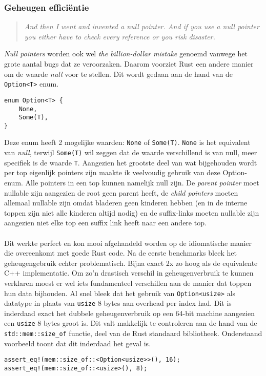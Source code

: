 \subsubsection{Geheugen efficiëntie}
\begin{quote}
    \textit{And then I went and invented a null pointer.
    And if you use a null pointer you either have to check every reference or you risk disaster. \cite{null_mistake}}
\end{quote}
\textit{Null pointers} worden ook wel \textit{the billion-dollar mistake} genoemd vanwege het grote aantal bugs dat ze veroorzaken.
Daarom voorziet Rust een andere manier om de waarde \textit{null} voor te stellen.
Dit wordt gedaan aan de hand van de \texttt{Option<T>} enum.

\begin{verbatim}
enum Option<T> {
    None,
    Some(T),
}
\end{verbatim}

Deze enum heeft 2 mogelijke waarden: \texttt{None} of \texttt{Some(T)}.
\texttt{None} is het equivalent van \textit{null}, terwijl \texttt{Some(T)} wil zeggen dat de waarde verschillend is van null, meer specifiek is de waarde \texttt{T}.
Aangezien het grootste deel van wat bijgehouden wordt per top eigenlijk pointers zijn maakte ik veelvoudig gebruik van deze Option-enum.
Alle pointers in een top kunnen namelijk null zijn.
De \textit{parent pointer} moet nullable zijn aangezien de root geen parent heeft, de \textit{child pointers} moeten allemaal nullable zijn omdat bladeren geen kinderen hebben (en in de interne toppen zijn niet alle kinderen altijd nodig) en de suffix-links moeten nullable zijn aangezien niet elke top een suffix link heeft naar een andere top.
\\ \\
Dit werkte perfect en kon mooi afgehandeld worden op de idiomatische manier die overeenkomt met goede Rust code.
Na de eerste benchmarks bleek het geheugengebruik echter problematisch.
Bijna exact 2x zo hoog als de equivalente C++ implementatie.
Om zo'n drastisch verschil in geheugenverbruik te kunnen verklaren moest er wel iets fundamenteel verschillen aan de manier dat toppen hun data bijhouden.
Al snel bleek dat het gebruik van \texttt{Option<usize>} als datatype in plaats van \texttt{usize} 8 bytes aan overhead per index had.
Dit is inderdaad exact het dubbele geheugenverbruik op een 64-bit machine aangezien een \texttt{usize} 8 bytes groot is.
Dit valt makkelijk te controleren aan de hand van de \texttt{std::mem::size\_of} functie, deel van de Rust standaard bibliotheek.
Onderstaand voorbeeld toont dat dit inderdaad het geval is.
\begin{verbatim}
assert_eq!(mem::size_of::<Option<usize>>(), 16);
assert_eq!(mem::size_of::<usize>(), 8);
\end{verbatim}

